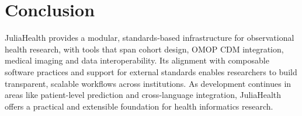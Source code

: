 \documentclass{juliacon}
\begin{document}
\section{Conclusion}
JuliaHealth provides a modular, standards-based infrastructure for observational health research, with tools that span cohort design, OMOP CDM integration, medical imaging and data interoperability. Its alignment with composable software practices and support for external standards enables researchers to build transparent, scalable workflows across institutions. As development continues in areas like patient-level prediction and cross-language integration, JuliaHealth offers a practical and extensible foundation for health informatics research.
\end{document}
